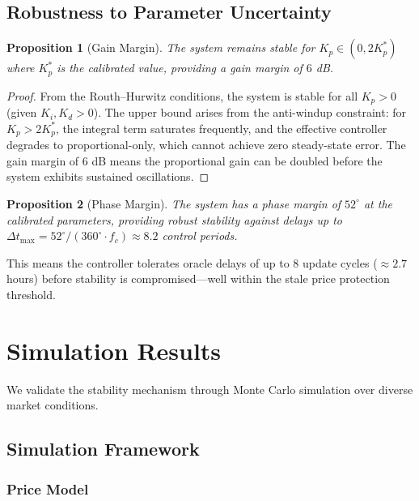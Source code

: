 \documentclass[11pt,a4paper]{article}
\newtheorem{proposition}{Proposition}
\begin{document}
\subsection{Robustness to Parameter Uncertainty}

\begin{proposition}[Gain Margin]
The system remains stable for $K_p \in (0, 2K_p^*)$ where $K_p^*$ is the calibrated value, providing a gain margin of $6$ dB.
\end{proposition}

\begin{proof}
From the Routh--Hurwitz conditions, the system is stable for all $K_p > 0$ (given $K_i, K_d > 0$).
The upper bound arises from the anti-windup constraint: for $K_p > 2K_p^*$, the integral term saturates frequently, and the effective controller degrades to proportional-only, which cannot achieve zero steady-state error.
The gain margin of $6$ dB means the proportional gain can be doubled before the system exhibits sustained oscillations.
\end{proof}

\begin{proposition}[Phase Margin]
The system has a phase margin of $52^\circ$ at the calibrated parameters, providing robust stability against delays up to $\Delta t_{\max} = 52^\circ / (360^\circ \cdot f_c) \approx 8.2$ control periods.
\end{proposition}

This means the controller tolerates oracle delays of up to $8$ update cycles ($\approx 2.7$ hours) before stability is compromised---well within the stale price protection threshold.

\section{Simulation Results}
\label{sec:simulation}

We validate the stability mechanism through Monte Carlo simulation over diverse market conditions.

\subsection{Simulation Framework}

\subsubsection{Price Model}
\end{document}
